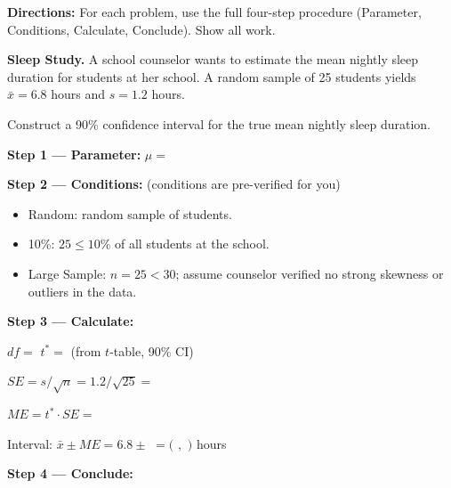 \documentclass[10pt]{article}
\begin{document}
\namepartnerperiod

\vspace{0.1in}
\textbf{Directions:} For each problem, use the full four-step procedure (Parameter,
Conditions, Calculate, Conclude). Show all work.

\begin{tcolorbox}[colback=white, colframe=black!40, title=\textbf{Tier R --- Remediate},
    fonttitle=\bfseries, arc=2mm, left=3mm, right=3mm, top=2mm, bottom=2mm]

\textbf{Sleep Study.} A school counselor wants to estimate the mean nightly sleep
duration for students at her school. A random sample of 25 students yields
$\bar x = 6.8$ hours and $s = 1.2$ hours.

Construct a 90\% confidence interval for the true mean nightly sleep duration.

\textbf{Step 1 --- Parameter:} $\mu = $ \writeline

\textbf{Step 2 --- Conditions:} (conditions are pre-verified for you)
\begin{itemize}
    \item Random: random sample of students. \checkmark
    \item 10\%: $25 \le 10\%$ of all students at the school. \checkmark
    \item Large Sample: $n = 25 < 30$; assume counselor verified no strong skewness or
          outliers in the data. \checkmark
\end{itemize}

\textbf{Step 3 --- Calculate:}

$df = $ \blank{2cm} \quad $t^* = $ \blank{2.5cm} (from $t$-table, 90\% CI)

$SE = s/\sqrt{n} = 1.2/\sqrt{25} = $ \blank{2.5cm}

$ME = t^* \cdot SE = $ \blank{4cm}

Interval: $\bar x \pm ME = 6.8 \pm $ \blank{2cm} $= ($ \blank{2cm} $,$ \blank{2cm} $)$ hours

\textbf{Step 4 --- Conclude:} 

\end{tcolorbox}
\end{document}
